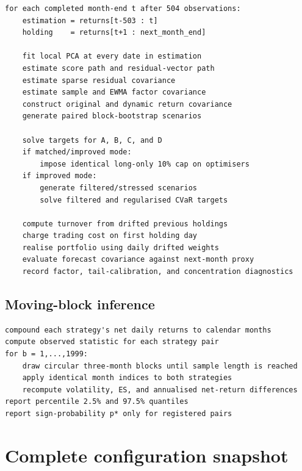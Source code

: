 \documentclass[11pt,a4paper]{article}
\begin{document}
\begin{lstlisting}
for each completed month-end t after 504 observations:
    estimation = returns[t-503 : t]
    holding    = returns[t+1 : next_month_end]

    fit local PCA at every date in estimation
    estimate score path and residual-vector path
    estimate sparse residual covariance
    estimate sample and EWMA factor covariance
    construct original and dynamic return covariance
    generate paired block-bootstrap scenarios

    solve targets for A, B, C, and D
    if matched/improved mode:
        impose identical long-only 10% cap on optimisers
    if improved mode:
        generate filtered/stressed scenarios
        solve filtered and regularised CVaR targets

    compute turnover from drifted previous holdings
    charge trading cost on first holding day
    realise portfolio using daily drifted weights
    evaluate forecast covariance against next-month proxy
    record factor, tail-calibration, and concentration diagnostics
\end{lstlisting}

\subsection{Moving-block inference}

\begin{lstlisting}
compound each strategy's net daily returns to calendar months
compute observed statistic for each strategy pair
for b = 1,...,1999:
    draw circular three-month blocks until sample length is reached
    apply identical month indices to both strategies
    recompute volatility, ES, and annualised net-return differences
report percentile 2.5% and 97.5% quantiles
report sign-probability p* only for registered pairs
\end{lstlisting}

\section{Complete configuration snapshot}
\end{document}
